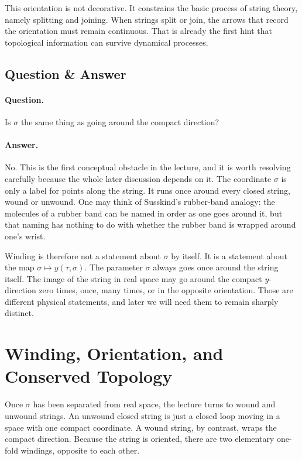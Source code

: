 This orientation is not decorative. It constrains the basic process of string theory, namely splitting and joining. When strings split or join, the arrows that record the orientation must remain continuous. That is already the first hint that topological information can survive dynamical processes.

\subsection{Question \& Answer}

\paragraph{Question.} Is \(\sigma\) the same thing as going around the compact direction?

\paragraph{Answer.} No. This is the first conceptual obstacle in the lecture, and it is worth resolving carefully because the whole later discussion depends on it. The coordinate \(\sigma\) is only a label for points along the string. It runs once around every closed string, wound or unwound. One may think of Susskind's rubber-band analogy: the molecules of a rubber band can be named in order as one goes around it, but that naming has nothing to do with whether the rubber band is wrapped around one's wrist.

Winding is therefore not a statement about \(\sigma\) by itself. It is a statement about the map \(\sigma \mapsto y(\tau,\sigma)\). The parameter \(\sigma\) always goes once around the string itself. The image of the string in real space may go around the compact \(y\)-direction zero times, once, many times, or in the opposite orientation. Those are different physical statements, and later we will need them to remain sharply distinct.

\section{Winding, Orientation, and Conserved Topology}

Once \(\sigma\) has been separated from real space, the lecture turns to wound and unwound strings. An unwound closed string is just a closed loop moving in a space with one compact coordinate. A wound string, by contrast, wraps the compact direction. Because the string is oriented, there are two elementary one-fold windings, opposite to each other.

